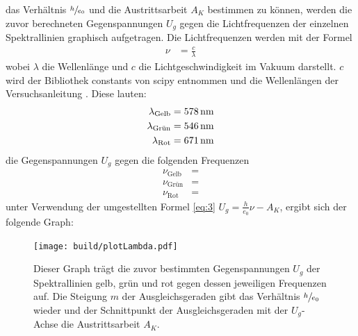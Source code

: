     \justifying das Verhältnis $\sfrac{h}{e_0}$ und die Austrittsarbeit $A_K$ bestimmen zu können, werden die zuvor berechneten Gegenspannungen $U_g$
    gegen die Lichtfrequenzen der einzelnen Spektrallinien graphisch aufgetragen. Die Lichtfrequenzen werden mit der Formel
    \begin{align}
    \nu &= \frac{c}{\lambda} \label{eq:17}
    \end{align}
    \justifying wobei $\lambda$ die Wellenlänge und $c$ die Lichtgeschwindigkeit im Vakuum darstellt. $c$ wird der Bibliothek constants
    von scipy \cite{scipy} entnommen und die Wellenlängen der Versuchsanleitung \cite{V500}. Diese lauten:
    \begin{subequations} \label{eq:18}
    \begin{align}
    \lambda_{\text{Gelb}} &= \text{\SI{578}{\nano\meter}} \label{eq:18a}\\
    \lambda_{\text{Grün}} &= \text{\SI{546}{\nano\meter}} \label{eq:18b}\\
    \lambda_{\text{Rot}} &= \text{\SI{671}{\nano\meter}} \label{eq:18c}
    \end{align}
    \end{subequations}
    \justifying die Gegenspannungen $U_g$ gegen die folgenden Frequenzen
    \begin{subequations} \label{eq:19}
    \begin{align}
    \nu_{\text{Gelb}} &= \text{} \label{eq:19a}\\
    \nu_{\text{Grün}} &= \text{} \label{eq:19b}\\
    \nu_{\text{Rot}} &= \text{} \label{eq:19c}
    \end{align}
    \end{subequations}
    \justifying unter Verwendung der umgestellten Formel \eqref{eq:3} $U_g = \frac{h}{e_0}\nu - A_K$, ergibt sich der folgende Graph:

    \begin{figure}[H]
        \centering
        \texttt{[image: build/plotLambda.pdf]}
        \caption{Dieser Graph trägt die zuvor bestimmten Gegenspannungen $U_g$ der Spektrallinien gelb, grün und rot gegen dessen jeweiligen Frequenzen auf. Die
        Steigung $m$ der Ausgleichsgeraden gibt das Verhältnis $\sfrac{h}{e_0}$ wieder und der Schnittpunkt der Ausgleichsgeraden mit der $U_g$-Achse die Austrittsarbeit $A_K$.}
        \label{fig:10}
    \end{figure}

